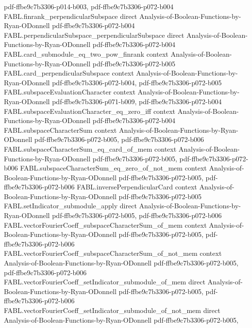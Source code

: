 \begin{theorem}
  {pdf-ffbe9c7b3306-p014-b003,
    pdf-ffbe9c7b3306-p072-b004}
\proofstep
  {FABL.finrank_perpendicularSubspace}
  {direct}
  {Analysis-of-Boolean-Functions-by-Ryan-ODonnell}
  {pdf-ffbe9c7b3306-p072-b004}
\proofstep
  {FABL.perpendicularSubspace_perpendicularSubspace}
  {direct}
  {Analysis-of-Boolean-Functions-by-Ryan-ODonnell}
  {pdf-ffbe9c7b3306-p072-b004}
\proofstep
  {FABL.card_submodule_eq_two_pow_finrank}
  {context}
  {Analysis-of-Boolean-Functions-by-Ryan-ODonnell}
  {pdf-ffbe9c7b3306-p072-b005}
\proofstep
  {FABL.card_perpendicularSubspace}
  {context}
  {Analysis-of-Boolean-Functions-by-Ryan-ODonnell}
  {pdf-ffbe9c7b3306-p072-b004,
    pdf-ffbe9c7b3306-p072-b005}
\proofstep
  {FABL.subspaceEvaluationCharacter}
  {context}
  {Analysis-of-Boolean-Functions-by-Ryan-ODonnell}
  {pdf-ffbe9c7b3306-p071-b009,
    pdf-ffbe9c7b3306-p072-b004}
\proofstep
  {FABL.subspaceEvaluationCharacter_eq_zero_iff}
  {context}
  {Analysis-of-Boolean-Functions-by-Ryan-ODonnell}
  {pdf-ffbe9c7b3306-p072-b004}
\proofstep
  {FABL.subspaceCharacterSum}
  {context}
  {Analysis-of-Boolean-Functions-by-Ryan-ODonnell}
  {pdf-ffbe9c7b3306-p072-b005,
    pdf-ffbe9c7b3306-p072-b006}
\proofstep
  {FABL.subspaceCharacterSum_eq_card_of_mem}
  {context}
  {Analysis-of-Boolean-Functions-by-Ryan-ODonnell}
  {pdf-ffbe9c7b3306-p072-b005,
    pdf-ffbe9c7b3306-p072-b006}
\proofstep
  {FABL.subspaceCharacterSum_eq_zero_of_not_mem}
  {context}
  {Analysis-of-Boolean-Functions-by-Ryan-ODonnell}
  {pdf-ffbe9c7b3306-p072-b005,
    pdf-ffbe9c7b3306-p072-b006}
\proofstep
  {FABL.inversePerpendicularCard}
  {context}
  {Analysis-of-Boolean-Functions-by-Ryan-ODonnell}
  {pdf-ffbe9c7b3306-p072-b005}
\proofstep
  {FABL.setIndicator_submodule_apply}
  {direct}
  {Analysis-of-Boolean-Functions-by-Ryan-ODonnell}
  {pdf-ffbe9c7b3306-p072-b005,
    pdf-ffbe9c7b3306-p072-b006}
\proofstep
  {FABL.vectorFourierCoeff_subspaceCharacterSum_of_mem}
  {context}
  {Analysis-of-Boolean-Functions-by-Ryan-ODonnell}
  {pdf-ffbe9c7b3306-p072-b005,
    pdf-ffbe9c7b3306-p072-b006}
\proofstep
  {FABL.vectorFourierCoeff_subspaceCharacterSum_of_not_mem}
  {context}
  {Analysis-of-Boolean-Functions-by-Ryan-ODonnell}
  {pdf-ffbe9c7b3306-p072-b005,
    pdf-ffbe9c7b3306-p072-b006}
\proofstep
  {FABL.vectorFourierCoeff_setIndicator_submodule_of_mem}
  {direct}
  {Analysis-of-Boolean-Functions-by-Ryan-ODonnell}
  {pdf-ffbe9c7b3306-p072-b005,
    pdf-ffbe9c7b3306-p072-b006}
\proofstep
  {FABL.vectorFourierCoeff_setIndicator_submodule_of_not_mem}
  {direct}
  {Analysis-of-Boolean-Functions-by-Ryan-ODonnell}
  {pdf-ffbe9c7b3306-p072-b005,
}
\end{theorem}
